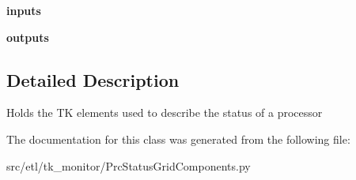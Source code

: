 \begin{DoxyCompactItemize}
\item 
\hypertarget{classetl_1_1tk__monitor_1_1PrcStatusGridComponents_1_1ProcessInGrid_a9b9bf20b632cc50881e5d1b02bda92da}{{\bfseries inputs}}\label{classetl_1_1tk__monitor_1_1PrcStatusGridComponents_1_1ProcessInGrid_a9b9bf20b632cc50881e5d1b02bda92da}

\item 
\hypertarget{classetl_1_1tk__monitor_1_1PrcStatusGridComponents_1_1ProcessInGrid_a967fefc47730d901087ed474596e397f}{{\bfseries outputs}}\label{classetl_1_1tk__monitor_1_1PrcStatusGridComponents_1_1ProcessInGrid_a967fefc47730d901087ed474596e397f}

\end{DoxyCompactItemize}


\subsection{Detailed Description}
\begin{DoxyVerb}Holds the TK elements used to describe the status of a processor\end{DoxyVerb}
 

The documentation for this class was generated from the following file\-:\begin{DoxyCompactItemize}
\item 
src/etl/tk\-\_\-monitor/Prc\-Status\-Grid\-Components.\-py\end{DoxyCompactItemize}
